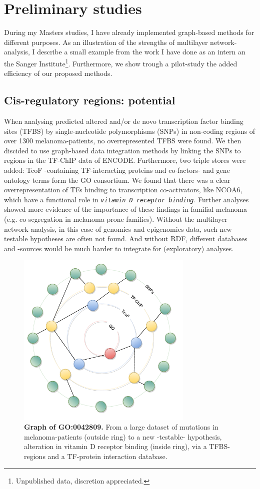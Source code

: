 \documentclass[twoside,fontsize=12pt]{article}
\begin{document}
\section*{Preliminary studies}
During my Masters studies, I have already implemented graph-based methods for different purposes. As an illustration of the strengths of multilayer network-analysis, I describe a small example from the work I have done as an intern an the Sanger Institute\footnote{Unpublished data, discretion appreciated.}. Furthermore, we show trough a pilot-study the added efficiency of our proposed methods.
\subsection*{Cis-regulatory regions: potential}
When analysing predicted altered and/or de novo transcription factor binding sites (TFBS) by single-nucleotide polymorphisms (SNPs) in non-coding regions of over 1300 melanoma-patients, no overrepresented TFBS were found. We then discided to use graph-based data integration methods by linking the SNPs to regions in the TF-ChIP data of ENCODE\cite{ENCODE}. Furthermore, two triple stores were added: TcoF -containing TF-interacting proteins and co-factors- and gene ontology terms form the GO consortium. We found that there was a clear overrepresentation of TFs binding to transcription co-activators, like NCOA6, which have a functional role in \emph{\lstinline|vitamin D receptor binding|}. Further analyses showed more evidence of the importance of these findings in familial melanoma (e.g. co-segregation in melanoma-prone families). Without the multilayer network-analysis, in this case of genomics and epigenomics data, such new testable hypotheses are often not found. And without RDF, different databases and -sources would be much harder to integrate for (exploratory) analyses. 
\begin{figure}[H]
    \centering
    \includegraphics[width=0.75\textwidth]{rondjeGraphs.pdf}
    \caption{\textbf{Graph of GO:0042809.} From a large dataset of mutations in melanoma-patients (outside ring) to a new -testable- hypothesis, alteration in vitamin D receptor binding (inside ring), via a TFBS-regions and a TF-protein interaction database.}
    \label{fig:mela}
\end{figure}
\end{document}
